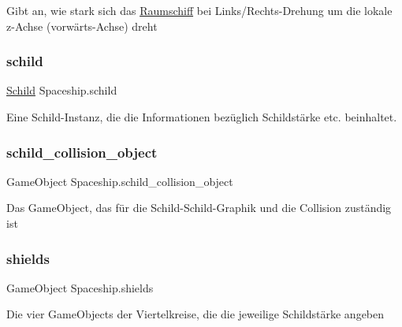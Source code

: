 Gibt an, wie stark sich das \hyperlink{class_raumschiff}{Raumschiff} bei Links/\+Rechts-\/\+Drehung um die lokale z-\/\+Achse (vorwärts-\/\+Achse) dreht 

\mbox{\label{class_spaceship_a45e154e6dacd6da7c800c94a05dd27b0}} 
\subsubsection{\texorpdfstring{schild}{schild}}
{\footnotesize\ttfamily \hyperlink{class_schild}{Schild} Spaceship.\+schild}



Eine Schild-\/\+Instanz, die die Informationen bezüglich Schildstärke etc. beinhaltet. 

\mbox{\label{class_spaceship_a40f7992de603fb76e22c3dcce1b63292}} 
\subsubsection{\texorpdfstring{schild\+\_\+collision\+\_\+object}{schild\_collision\_object}}
{\footnotesize\ttfamily Game\+Object Spaceship.\+schild\+\_\+collision\+\_\+object}



Das Game\+Object, das für die Schild-\/\+Schild-\/\+Graphik und die Collision zuständig ist 

\mbox{\label{class_spaceship_a128777395236ab7a2ef22f1f44ef903b}} 
\subsubsection{\texorpdfstring{shields}{shields}}
{\footnotesize\ttfamily Game\+Object Spaceship.\+shields}



Die vier Game\+Objects der Viertelkreise, die die jeweilige Schildstärke angeben 

\mbox{\label{class_spaceship_a3b6cdeee7ecba55cf3807661e8662bea}} 
